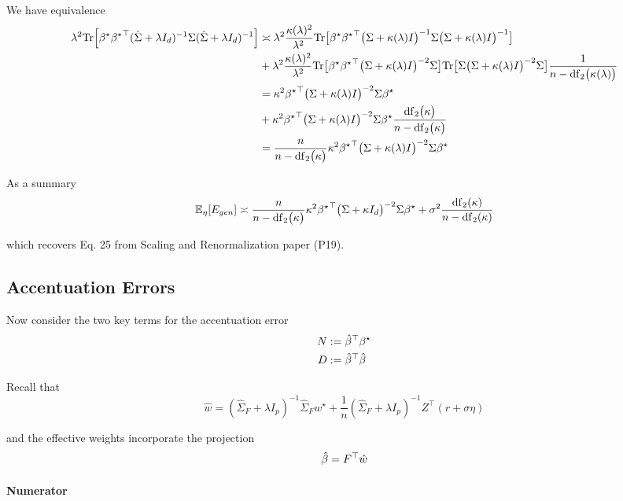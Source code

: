 \begin{minipage}[t]{1\columnwidth}
We have equivalence
\begin{align*}
\lambda^{2}\mathrm{Tr}\Big[{\beta^{\star}}{{\beta^{\star}}}^{\top}(\hat{\Sigma}+\lambda I_{d})^{-1}\Sigma(\hat{\Sigma}+\lambda I_{d})^{-1}\Big] & \asymp\lambda^{2}\frac{\kappa(\lambda)^{2}}{\lambda^{2}\,}\mbox{Tr}\bigl[{\beta^{\star}}{{\beta^{\star}}}^{\top}\bigl(\Sigma+\kappa(\lambda)I\bigr)^{-1}\Sigma\bigl(\Sigma+\kappa(\lambda)I\bigr)^{-1}\bigr]\\
 & +\lambda^{2}\frac{\kappa(\lambda)^{2}}{\lambda^{2}}\mbox{Tr}\bigl[{\beta^{\star}}{{\beta^{\star}}}^{\top}\bigl(\Sigma+\kappa(\lambda)I\bigr)^{-2}\Sigma\bigr]\mbox{Tr}\bigl[\Sigma\bigl(\Sigma+\kappa(\lambda)I\bigr)^{-2}\Sigma\bigr]\frac{1}{n-\mathrm{df}_{2}\bigl(\kappa(\lambda)\bigr)}\\
 & =\kappa^{2}{{\beta^{\star}}}^{\top}\bigl(\Sigma+\kappa(\lambda)I\bigr)^{-2}\Sigma{\beta^{\star}}\\
 & +\kappa^{2}{{\beta^{\star}}}^{\top}\bigl(\Sigma+\kappa(\lambda)I\bigr)^{-2}\Sigma{\beta^{\star}}\frac{\mathrm{df}_{2}\bigl(\kappa\bigr)}{n-\mathrm{df}_{2}\bigl(\kappa\bigr)}\\
 & =\frac{n}{n-\mathrm{df}_{2}\bigl(\kappa\bigr)}\kappa^{2}{{\beta^{\star}}}^{\top}\bigl(\Sigma+\kappa(\lambda)I\bigr)^{-2}\Sigma{\beta^{\star}}
\end{align*}

As a summary
\[
\mathbb{E}_{\eta}[E_{gen}]\asymp\frac{n}{n-\mathrm{df}_{2}\bigl(\kappa\bigr)}\kappa^{2}{{\beta^{\star}}}^{\top}\bigl(\Sigma+\kappa I_{d}\bigr)^{-2}\Sigma{\beta^{\star}}+\sigma^{2}\frac{\mathrm{df}_{2}(\kappa)}{n-\mathrm{df}_{2}(\kappa)}
\]

which recovers Eq. 25 from Scaling and Renormalization paper (P19).%
\end{minipage}

\subsection{Accentuation Errors}

Now consider the two key terms for the accentuation error
\begin{align*}
N & :={\hat{\beta}}^{\top}{\beta^{\star}}\\
D & :={\hat{\beta}}^{\top}\hat{\beta}
\end{align*}

Recall that
\[
\hat{w}=(\hat{\Sigma}_{F}+\lambda I_{p})^{-1}\hat{\Sigma}_{F}w^{\star}+\frac{1}{n}(\hat{\Sigma}_{F}+\lambda I_{p})^{-1}Z^{\top}(r+\sigma\eta)
\]

and the effective weights incorporate the projection
\[
\hat{\beta}=F^{\top}\hat{w}
\]


\paragraph{Numerator}

